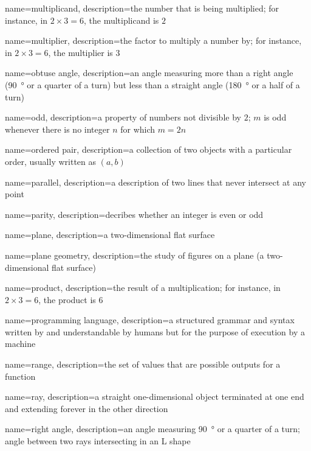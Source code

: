 {
  name=multiplicand,
  description={the number that is being multiplied; for instance, in
  $2\times3=6$, the multiplicand is $2$}
}

{
  name=multiplier,
  description={the factor to multiply a number by; for instance, in
  $2\times3=6$, the multiplier is $3$}
}

{
  name=obtuse angle,
  description={an angle measuring more than a right angle (\SI{90}{\degree} or a
  quarter of a turn) but less than a straight angle (\SI{180}{\degree} or a half
  of a turn)}
}

{
  name=odd,
  description={a property of numbers not divisible by \(2\); \(m\) is odd
  whenever there is no integer \(n\) for which \(m = 2n\)}
}

{
  name=ordered pair,
  description={a collection of two objects with a particular order, usually
  written as \((a, b)\)}
}

{
  name=parallel,
  description={a description of two lines that never intersect at any point}
}

{
  name=parity,
  description={decribes whether an integer is even or odd}
}

{
  name=plane,
  description={a two-dimensional flat surface}
}

{
  name=plane geometry,
  description={the study of figures on a plane (a two-dimensional flat surface)}
}

{
  name=product,
  description={the result of a multiplication; for instance, in
  $2\times3=6$, the product is $6$}
}

{
  name=programming language,
  description={a structured grammar and syntax written by and understandable by
  humans but for the purpose of execution by a machine}
}

{
  name=range,
  description={the set of values that are possible outputs for a function}
}

{
  name=ray,
  description={a straight one-dimensional object terminated at one end and
  extending forever in the other direction}
}

{
  name=right angle,
  description={an angle measuring \SI{90}{\degree} or a quarter of a turn; angle
  between two rays intersecting in an L shape}
}

